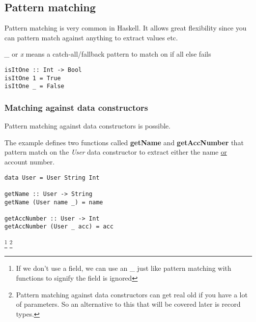 \subsection{Pattern matching}
Pattern matching is very common in Haskell. It allows great flexibility since you can pattern match
against anything to extract values etc.

\emph{\_} or \emph{x} means a catch-all/fallback pattern to match on if all else fails

\begin{lstlisting}
isItOne :: Int -> Bool
isItOne 1 = True
isItOne _ = False
\end{lstlisting}

\subsubsection{Matching against data constructors}
Pattern matching against data constructors is possible.

The example defines two functions called \textbf{getName} and \textbf{getAccNumber} that
pattern match on the \emph{User} data constructor to extract either the name \underline{or} account number.

\begin{lstlisting}
data User = User String Int

getName :: User -> String
getName (User name _) = name

getAccNumber :: User -> Int
getAccNumber (User _ acc) = acc
\end{lstlisting}

\footnote{If we don't use a field, we can use an \_ just like pattern matching with functions to signify the field is ignored}
\footnote{
    Pattern matching against data constructors can get real old if you have a lot of parameters.
    So an alternative to this that will be covered later is record types.
}